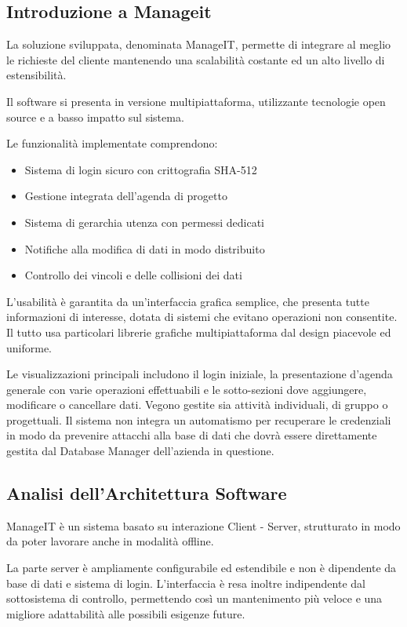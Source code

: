 \documentclass[12pt]{scrartcl}
\begin{document}
\subsection{Introduzione a Manageit}
La soluzione sviluppata, denominata ManageIT, permette di integrare
al meglio le richieste del cliente mantenendo una scalabilit\`a costante
ed un alto livello di estensibilit\`a.

Il software si presenta in versione multipiattaforma, 
utilizzante tecnologie open source
e a basso impatto sul sistema.

Le funzionalit\`a implementate comprendono:
\begin{itemize}
\item Sistema di login sicuro con crittografia SHA-512
\item Gestione integrata dell'agenda di progetto
\item Sistema di gerarchia utenza con permessi dedicati
\item Notifiche alla modifica di dati in modo distribuito
\item Controllo dei vincoli e delle collisioni dei dati
\end{itemize}

L'usabilit\`a \`e garantita da un'interfaccia
grafica semplice, che presenta tutte informazioni di interesse, dotata di
sistemi che evitano operazioni non consentite. Il tutto usa particolari
librerie grafiche multipiattaforma dal design piacevole ed
uniforme.

Le visualizzazioni principali includono il login iniziale,
la presentazione d'agenda generale con varie operazioni
effettuabili e le sotto-sezioni dove aggiungere, modificare o
cancellare dati. Vegono gestite sia attivit\`a individuali, di gruppo o progettuali.
Il sistema non integra
un automatismo per recuperare le credenziali in modo da prevenire
attacchi alla base di dati che dovr\`a essere direttamente gestita
dal Database Manager dell'azienda in questione.

\subsection{Analisi dell'Architettura Software}
ManageIT \`e un sistema basato su interazione Client - Server, strutturato
in modo da poter lavorare anche in modalit\`a offline.

La parte server \`e ampliamente configurabile ed estendibile e non \`e dipendente
da base di dati e sistema di login.
L'interfaccia \`e resa inoltre indipendente dal sottosistema di controllo,
permettendo cos\`i un mantenimento pi\`u veloce e una migliore adattabilit\`a
alle possibili esigenze future.
\end{document}
